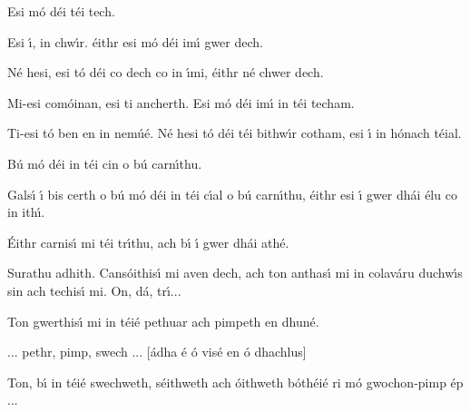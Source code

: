 \begingroup
\fontsize{10pt}{12pt}\selectfont
\begin{leftbubbles}Esi m\'{o} d\'{e}i t\'{e}i tech.\end{leftbubbles}
\begin{rightbubbles}Esi \'{\i}, in chw\'{\i}r. \'{e}ithr esi m\'{o} d\'{e}i im\'{\i} gwer dech.\end{rightbubbles}
\begin{leftbubbles}N\'{e} hesi, esi t\'{o} d\'{e}i co dech co in \'{\i}mi, \'{e}ithr n\'{e} chwer dech.\end{leftbubbles}
\begin{rightbubbles}Mi-esi com\'{o}inan, esi ti ancherth. Esi m\'{o} d\'{e}i im\'{\i} in t\'{e}i techam.\end{rightbubbles}
\begin{leftbubbles}Ti-esi t\'{o} ben en in nem\'{u}\'{e}. N\'{e} hesi t\'{o} d\'{e}i t\'{e}i bithw\'{\i}r cotham, esi \'{\i} in h\'{o}nach t\'{e}ial.\end{leftbubbles}
\begin{rightbubbles}B\'{u} m\'{o} d\'{e}i in t\'{e}i cin o b\'{u} carn\'{\i}thu.\end{rightbubbles}
\begin{leftbubbles}Gals\'{\i} \'{\i} bis certh o b\'{u} m\'{o} d\'{e}i in t\'{e}i c\'{\i}al o b\'{u} carn\'{\i}thu, \'{e}ithr esi \'{\i} gwer dh\'{a}i \'{e}lu co in ith\'{\i}.\end{leftbubbles}
\begin{rightbubbles}\'{E}ithr carnis\'{\i} mi t\'{e}i tr\'{\i}thu, ach b\'{\i} \'{\i} gwer dh\'{a}i ath\'{e}.\end{rightbubbles}
\begin{leftbubbles}Surathu adhith. Cans\'{o}ithis\'{\i} mi aven dech, ach ton anthas\'{\i} mi in colav\'{a}ru duchw\'{\i}s sin ach techis\'{\i} mi. On, d\'{a}, tr\'{\i}...\end{leftbubbles}
\begin{rightbubbles}Ton gwerthis\'{\i} mi in t\'{e}i\'{e} pethuar ach pimpeth en dhun\'{e}.\end{rightbubbles}
\begin{leftbubbles}... pethr, pimp, swech ... [\'{a}dha \'{e} \'{o} vis\'{e} en \'{o} dhachlus]\end{leftbubbles}
\begin{rightbubbles}Ton, b\'{\i} in t\'{e}i\'{e} swechweth, s\'{e}ithweth ach \'{o}ithweth b\'{o}th\'{e}i\'{e} ri m\'{o} gwochon-pimp \'{e}p ...\end{rightbubbles}
